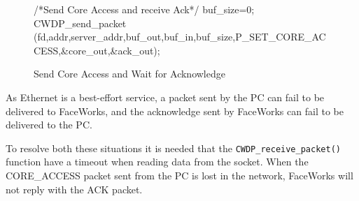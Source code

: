 \documentclass[defaultstyle,10pt,master,Helvetica]{thesis}
\begin{document}
\begin{figure}[h]
\begin{boxedverbatim}
/*Send Core Access and receive Ack*/
buf_size=0;
CWDP_send_packet (fd,addr,server_addr,buf_out,buf_in,buf_size,P_SET_CORE_ACCESS,&core_out,&ack_out);
\end{boxedverbatim}
\caption{Send Core Access and Wait for Acknowledge}
\label{chp3:code_coreaccess}
\end{figure}


As Ethernet is a best-effort service, a packet sent by the PC can fail to be delivered to FaceWorks, and the acknowledge sent by FaceWorks can fail to be delivered to the PC.

To resolve both these situations it is needed that the \texttt{CWDP\_receive\_packet()} function have a timeout when reading data from the socket. When the CORE\_ACCESS packet sent from the PC is lost in the network, FaceWorks will not reply with the ACK packet.
\clearpage
\end{document}
